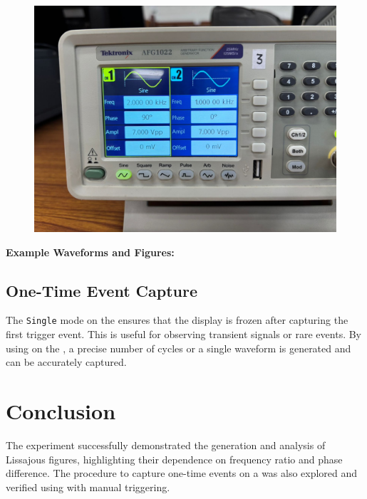 \documentclass[report]{IEEEtran}
\begin{document}
\begin{figure}[h!]
\begin{minipage}{0.3\textwidth}
    \end{minipage}
    \hfill
    \begin{minipage}{0.3\textwidth}
        \centering
        \includegraphics[width=\textwidth]{figs/fig1.jpeg}
    \end{minipage}
\end{figure}
            
\textbf{Example Waveforms and Figures:}



\noindent{}

\subsection*{One-Time Event Capture}
The \texttt{Single} mode on the  ensures that the display is frozen after capturing the first trigger event. This is useful for observing transient signals or rare events. By using  on the , a precise number of cycles or a single waveform is generated and can be accurately captured.

\section*{Conclusion}
The experiment successfully demonstrated the generation and analysis of Lissajous figures, highlighting their dependence on frequency ratio and phase difference. The procedure to capture one-time events on a  was also explored and verified using  with manual triggering.
\end{document}
